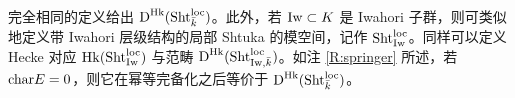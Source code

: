\begin{rmk}
完全相同的定义给出 $\on{D}^\Hk(\Sht^{\loc}_{\bar k})$。此外，若 $\on{Iw}\subset K$ 是 Iwahori 子群，则可类似地定义带 Iwahori 层级结构的局部 Shtuka 的模空间，记作 $\Sht^{\loc}_{\on{Iw}}$。同样可以定义 Hecke 对应 $\Hk(\Sht^{\loc}_{\on{Iw}})$ 与范畴 $\on{D}^\Hk(\Sht^{\loc}_{\on{Iw},\bar k})$。如注 \ref{R:springer} 所述，若 $\cha E=0$，则它在幂等完备化之后等价于 $\on{D}^\Hk(\Sht^{\loc}_{\bar k})$。
\end{rmk}
